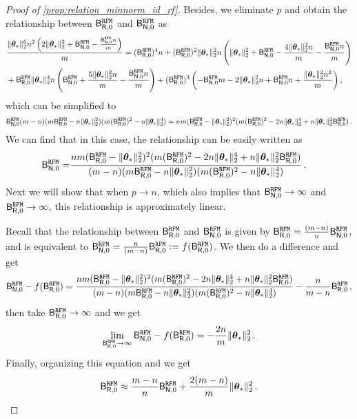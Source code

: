 \begin{proof}[Proof of \cref{prop:relation_minnorm_id_rf}]
Besides, we eliminate $p$ and obtain the relationship between $\mathsf B^{\tt RFM}_{\mathsf R,0}$ and $\mathsf B^{\tt RFM}_{\mathsf N,0}$ as
\[
\begin{aligned}
&\frac{\|{\boldsymbol \theta}_*\|_2^6 n^2 \left( 2 \|{\boldsymbol \theta}_*\|_2^2 + \mathsf B^{\tt RFM}_{\mathsf N,0} - \frac{\mathsf B^{\tt RFM}_{\mathsf N,0} n}{m} \right)}{m} 
=
(\mathsf B^{\tt RFM}_{\mathsf R,0})^4 n 
+ 
(\mathsf B^{\tt RFM}_{\mathsf R,0})^2 \|{\boldsymbol \theta}_*\|_2^2 n \left( \|{\boldsymbol \theta}_*\|_2^2 + \mathsf B^{\tt RFM}_{\mathsf N,0} - \frac{4 \|{\boldsymbol \theta}_*\|_2^2 n}{m} - \frac{\mathsf B^{\tt RFM}_{\mathsf N,0} n}{m} \right)\\
& + \mathsf B^{\tt RFM}_{\mathsf R,0} \|{\boldsymbol \theta}_*\|_2^4 n \left( \mathsf B^{\tt RFM}_{\mathsf N,0} + \frac{5 \|{\boldsymbol \theta}_*\|_2^2 n}{m} - \frac{\mathsf B^{\tt RFM}_{\mathsf N,0} n}{m} \right)
+ 
(\mathsf B^{\tt RFM}_{\mathsf R,0})^3 \left( -\mathsf B^{\tt RFM}_{\mathsf N,0} m - 2 \|{\boldsymbol \theta}_*\|_2^2 n + \mathsf B^{\tt RFM}_{\mathsf N,0} n + \frac{\|{\boldsymbol \theta}_*\|_2^2 n^2}{m} \right),
\end{aligned}
\]
which can be simplified to
\[
\begin{aligned}
    \mathsf B^{\tt RFM}_{\mathsf N,0}(m-n)(m\mathsf B^{\tt RFM}_{\mathsf R,0}-n\|{\boldsymbol \theta}_*\|_2^2)(m(\mathsf B^{\tt RFM}_{\mathsf R,0})^2-n\|{\boldsymbol \theta}_*\|_2^4) 
    = 
    nm(\mathsf B^{\tt RFM}_{\mathsf R,0}-\|{\boldsymbol \theta}_*\|_2^2)^2(m(\mathsf B^{\tt RFM}_{\mathsf R,0})^2-2n\|{\boldsymbol \theta}_*\|_2^4+n\|{\boldsymbol \theta}_*\|_2^2\mathsf B^{\tt RFM}_{\mathsf R,0})\,.
\end{aligned}
\]
We can find that in this case, the relationship can be easily written as
\[
\begin{aligned}
    \mathsf B^{\tt RFM}_{\mathsf N,0} =& \frac{nm(\mathsf B^{\tt RFM}_{\mathsf R,0}-\|{\boldsymbol \theta}_*\|_2^2)^2(m(\mathsf B^{\tt RFM}_{\mathsf R,0})^2-2n\|{\boldsymbol \theta}_*\|_2^4+n\|{\boldsymbol \theta}_*\|_2^2\mathsf B^{\tt RFM}_{\mathsf R,0})}{(m-n)(m\mathsf B^{\tt RFM}_{\mathsf R,0}-n\|{\boldsymbol \theta}_*\|_2^2)(m(\mathsf B^{\tt RFM}_{\mathsf R,0})^2-n\|{\boldsymbol \theta}_*\|_2^4)}\,.
\end{aligned}
\]
Next we will show that when $p \to n$, which also implies that $\mathsf B^{\tt RFM}_{\mathsf N,0} \to \infty$ and $\mathsf B^{\tt RFM}_{\mathsf R,0} \to \infty$, this relationship is approximately linear.

Recall that the relationship between $\mathsf B^{\tt RFM}_{\mathsf R,0}$ and $\mathsf B^{\tt RFM}_{\mathsf N,0}$ is given by \(\mathsf B^{\tt RFM}_{\mathsf R,0} = \frac{(m-n)}{n}\mathsf B^{\tt RFM}_{\mathsf N,0}\), and is equivalent to \(\mathsf B^{\tt RFM}_{\mathsf N,0} = \frac{n}{(m-n)}\mathsf B^{\tt RFM}_{\mathsf R,0} := f(\mathsf B^{\tt RFM}_{\mathsf R,0})\). We then do a difference and get
\[
\mathsf B^{\tt RFM}_{\mathsf N,0} - f(\mathsf B^{\tt RFM}_{\mathsf R,0}) = \frac{nm(\mathsf B^{\tt RFM}_{\mathsf R,0}-\|{\boldsymbol \theta}_*\|_2^2)^2(m(\mathsf B^{\tt RFM}_{\mathsf R,0})^2-2n\|{\boldsymbol \theta}_*\|_2^4+n\|{\boldsymbol \theta}_*\|_2^2\mathsf B^{\tt RFM}_{\mathsf R,0})}{(m-n)(m\mathsf B^{\tt RFM}_{\mathsf R,0}-n\|{\boldsymbol \theta}_*\|_2^2)(m(\mathsf B^{\tt RFM}_{\mathsf R,0})^2-n\|{\boldsymbol \theta}_*\|_2^4)} - \frac{n}{m-n}\mathsf B^{\tt RFM}_{\mathsf R,0}\,,
\]
then take \(\mathsf B^{\tt RFM}_{\mathsf R,0} \to \infty\) and we get
\[
\lim_{\mathsf B^{\tt RFM}_{\mathsf R,0} \to \infty}\mathsf B^{\tt RFM}_{\mathsf N,0} - f(\mathsf B^{\tt RFM}_{\mathsf R,0}) = -\frac{2n}{m}\|{\boldsymbol \theta}_*\|_2^2\,.
\]
Finally, organizing this equation and we get
\[
    \mathsf B^{\tt RFM}_{\mathsf R,0} \approx \frac{m-n}{n}\mathsf B^{\tt RFM}_{\mathsf N,0} + \frac{2(m-n)}{m}\|{\boldsymbol \theta}_*\|_2^2\,.
\]
\end{proof}

